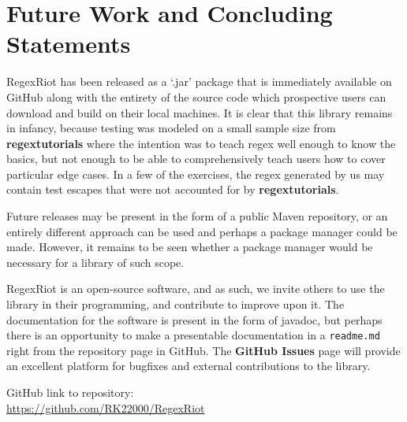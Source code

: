 \documentclass[conference]{IEEEtran}
\begin{document}
\section{Future Work and Concluding Statements}

RegexRiot has been released as a `.jar' package that is immediately available
on GitHub along with the entirety of the source code which prospective users
can download and build on their local machines. It is clear that this library
remains in infancy, because testing was modeled on a small sample size from
\textbf{regextutorials} where the intention was to
teach regex well enough to know the basics, but not enough to be able to
comprehensively teach users how to cover particular edge cases.
In a few of the exercises, the regex generated by us may contain test escapes
that were not accounted for by \textbf{regextutorials}.\cite{regextutorials}

Future releases may be present in the form of a public Maven repository,
or an entirely different approach can be used and perhaps a package manager
could be made. However, it remains to be seen whether a package manager would
be necessary for a library of such scope.

RegexRiot is an open-source software, and as such, we invite others to use the library
in their programming, and contribute to improve upon it. The documentation for
the software is present in the form of javadoc, but perhaps there is an
opportunity to make a presentable documentation in a \texttt{readme.md}
right from the repository page in GitHub. The \textbf{GitHub Issues} page will provide
an excellent platform for bugfixes and external contributions to the library.

GitHub link to repository:\\
\url{https://github.com/RK22000/RegexRiot}



\end{document}
